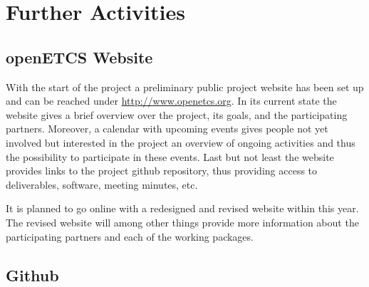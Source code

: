 ﻿\section{Further Activities}\label{sct:further_activities}

\subsection{openETCS Website}
With the start of the project a preliminary public project website has been set up and can be reached under \url{http://www.openetcs.org}. In its current state the website gives a brief overview over the project, its goals, and the participating partners. Moreover, a calendar with upcoming events gives people not yet involved but interested in the project an overview of ongoing activities and thus the possibility to participate in these events. Last but not least the website provides links to the project github repository, thus providing access to deliverables, software, meeting minutes, etc.

It is planned to go online with a redesigned and revised website within this year. The revised website will among other things provide more information about the participating partners and each of the working packages.


\subsection{Github}




